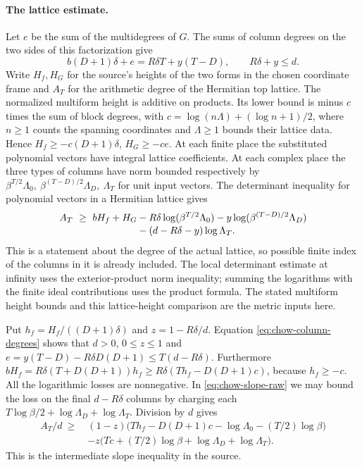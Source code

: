 \paragraph{The lattice estimate.}
Let \(e\) be the sum of the multidegrees of \(G\). The sums of column
degrees on the two sides of this factorization give
\begin{equation}\label{eq:chow-column-degrees}
 b(D+1)\delta+e=R\delta T+y(T-D),\qquad R\delta+y\le d .
\end{equation}
Write \(H_f,H_G\) for the source's heights of the two forms in the
chosen coordinate frame and \(A_T\) for the arithmetic degree of
the Hermitian top lattice. The normalized multiform height is additive
on products. Its lower bound is minus \(c\) times the sum of block
degrees, with \(c=\log(n\Lambda)+(\log n+1)/2\), where \(n\ge1\)
counts the spanning coordinates and \(\Lambda\ge1\) bounds their
lattice data. Hence \(H_f\ge-c(D+1)\delta\), \(H_G\ge-ce\).
At each finite place the substituted polynomial vectors have integral
lattice coefficients. At each complex place the three types of columns
have norm bounded respectively by
\(\beta^{T/2}\Lambda_0,\ \beta^{(T-D)/2}\Lambda_D,\ \Lambda_T\)
for unit input vectors. The determinant inequality for polynomial
vectors in a Hermitian lattice gives
\begin{align}
 A_T\ \ge\ bH_f+H_G
   &-R\delta\log(\beta^{T/2}\Lambda_0)
       -y\log(\beta^{(T-D)/2}\Lambda_D) \notag\\[-2pt]
   &-(d-R\delta-y)\log\Lambda_T .\label{eq:chow-slope-raw}
\end{align}
This is a statement about the degree of the actual lattice, so possible
finite index of the columns in it is already included. The local
determinant estimate at infinity uses the exterior-product norm
inequality; summing the logarithms with the finite ideal contributions
uses the product formula. The stated multiform height bounds and this
lattice-height comparison are the metric inputs here.

Put \(h_f=H_f/((D+1)\delta)\) and \(z=1-R\delta/d\).
Equation \eqref{eq:chow-column-degrees} shows that \(d>0\),
\(0\le z\le1\) and \(e=y(T-D)-R\delta D(D+1)\le T(d-R\delta)\).
Furthermore
\(bH_f=R\delta (T+D(D+1))h_f
\ge R\delta(Th_f-D(D+1)c)\), because \(h_f\ge-c\).
All the logarithmic losses are nonnegative. In
\eqref{eq:chow-slope-raw} we may bound the loss on the final
\(d-R\delta\) columns by charging each
\(T\log\beta/2+\log\Lambda_D+\log\Lambda_T\). Division by \(d\) gives
\begin{align*}
 A_T/d \ \ge\
 &(1-z)\bigl(Th_f-D(D+1)c-\log\Lambda_0-(T/2)\log\beta\bigr)\\
 &-z\bigl(Tc+(T/2)\log\beta+\log\Lambda_D+\log\Lambda_T\bigr).
\end{align*}
This is the intermediate slope inequality in the source.

